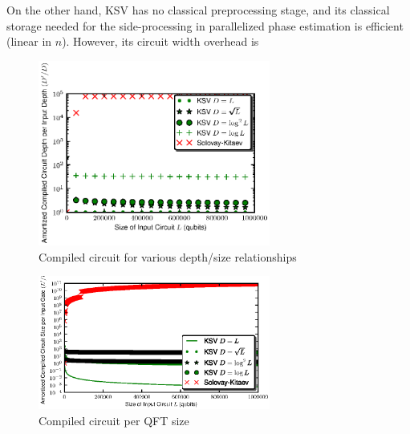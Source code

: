 
On the other hand, KSV has no classical preprocessing stage, and its classical
storage needed for the side-processing in parallelized phase estimation is
efficient (linear in $n$). However, its circuit width overhead is






\begin{center}
\begin{figure}[h!]
\label{fig:many-depth}
\includegraphics[width=3in]{figures/ksv-many-depths.eps}
\caption{Compiled circuit for various depth/size relationships}
\end{figure}
\end{center}

\begin{center}
\begin{figure}[h!]
\label{fig:one-size}
\includegraphics[width=3in]{figures/ksv-one-size.eps}
\caption{Compiled circuit per QFT size}
\end{figure}
\end{center}

